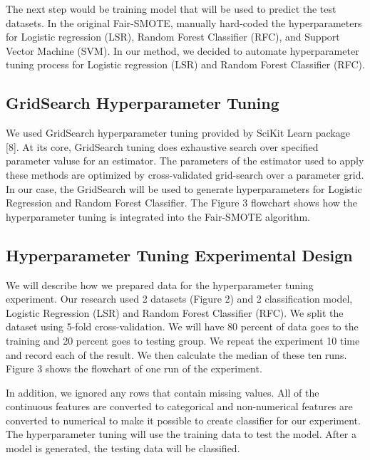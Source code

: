 \documentclass[sigconf]{acmart}
\begin{document}
The next step would be training model that will be used to predict the test datasets. In the original Fair-SMOTE, manually hard-coded the hyperparameters for Logistic regression (LSR), Random Forest Classifier (RFC), and Support Vector Machine (SVM). In our method, we decided to automate hyperparameter tuning process for Logistic regression (LSR) and Random Forest Classifier (RFC). 

\subsection{GridSearch Hyperparameter Tuning}
We used GridSearch hyperparameter tuning provided by SciKit Learn package [8]. At its core, GridSearch tuning does exhaustive search over specified parameter valuse for an estimator. The parameters of the estimator used to apply these methods are optimized by cross-validated grid-search over a parameter grid. In our case, the GridSearch will be used to generate hyperparameters for Logistic Regression and Random Forest Classifier. The Figure 3 flowchart shows how the hyperparameter tuning is integrated into the Fair-SMOTE algorithm.

\subsection{Hyperparameter Tuning Experimental Design}
We will describe how we prepared data for the hyperparameter tuning experiment. Our research used 2 datasets (Figure 2) and 2 classification model, Logistic Regression (LSR) and Random Forest Classifier (RFC). We split the dataset using 5-fold cross-validation. We will have 80 percent of data goes to the training and 20 percent goes to testing group. We repeat the experiment 10 time and record each of the result. We then calculate the median of these ten runs. Figure 3 shows the flowchart of one run of the experiment.

In addition, we ignored any rows that contain missing values. All of the continuous features are converted to categorical and non-numerical features are converted to numerical to make it possible to create classifier for our experiment. The hyperparameter tuning will use the training data to test the model. After a model is generated, the testing data will be classified. 
\end{document}
